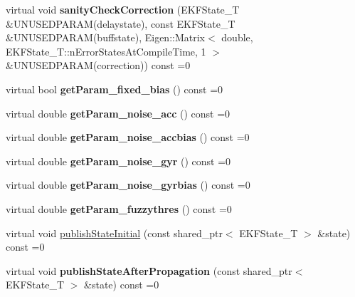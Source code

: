 \begin{DoxyCompactItemize}
\item 
\hypertarget{classmsf__core_1_1MSF__SensorManager_ae605f79877bbdd7ec297d5fe375f4c92}{virtual void {\bfseries sanity\-Check\-Correction} (E\-K\-F\-State\-\_\-\-T \&U\-N\-U\-S\-E\-D\-P\-A\-R\-A\-M(delaystate), const E\-K\-F\-State\-\_\-\-T \&U\-N\-U\-S\-E\-D\-P\-A\-R\-A\-M(buffstate), Eigen\-::\-Matrix$<$ double, E\-K\-F\-State\-\_\-\-T\-::n\-Error\-States\-At\-Compile\-Time, 1 $>$ \&U\-N\-U\-S\-E\-D\-P\-A\-R\-A\-M(correction)) const =0}\label{classmsf__core_1_1MSF__SensorManager_ae605f79877bbdd7ec297d5fe375f4c92}

\item 
\hypertarget{classmsf__core_1_1MSF__SensorManager_a5eb7188dea0d2aa231732199fd06b988}{virtual bool {\bfseries get\-Param\-\_\-fixed\-\_\-bias} () const =0}\label{classmsf__core_1_1MSF__SensorManager_a5eb7188dea0d2aa231732199fd06b988}

\item 
\hypertarget{classmsf__core_1_1MSF__SensorManager_a647bebf2feecd2929f58d6b4c8b3b319}{virtual double {\bfseries get\-Param\-\_\-noise\-\_\-acc} () const =0}\label{classmsf__core_1_1MSF__SensorManager_a647bebf2feecd2929f58d6b4c8b3b319}

\item 
\hypertarget{classmsf__core_1_1MSF__SensorManager_a7e7342acff24a4b5c5817903b2c8dfda}{virtual double {\bfseries get\-Param\-\_\-noise\-\_\-accbias} () const =0}\label{classmsf__core_1_1MSF__SensorManager_a7e7342acff24a4b5c5817903b2c8dfda}

\item 
\hypertarget{classmsf__core_1_1MSF__SensorManager_ae7b3b5a203fe118961ecdf28b49bfaa9}{virtual double {\bfseries get\-Param\-\_\-noise\-\_\-gyr} () const =0}\label{classmsf__core_1_1MSF__SensorManager_ae7b3b5a203fe118961ecdf28b49bfaa9}

\item 
\hypertarget{classmsf__core_1_1MSF__SensorManager_a8a5c694d3c6e5bd5bf4724269613bcb6}{virtual double {\bfseries get\-Param\-\_\-noise\-\_\-gyrbias} () const =0}\label{classmsf__core_1_1MSF__SensorManager_a8a5c694d3c6e5bd5bf4724269613bcb6}

\item 
\hypertarget{classmsf__core_1_1MSF__SensorManager_ab4498922d3d876ed9c4c5eeb7e090529}{virtual double {\bfseries get\-Param\-\_\-fuzzythres} () const =0}\label{classmsf__core_1_1MSF__SensorManager_ab4498922d3d876ed9c4c5eeb7e090529}

\item 
virtual void \hyperlink{classmsf__core_1_1MSF__SensorManager_ad851fff1bceaeb6696ef79a4792a317a}{publish\-State\-Initial} (const shared\-\_\-ptr$<$ E\-K\-F\-State\-\_\-\-T $>$ \&state) const =0
\item 
\hypertarget{classmsf__core_1_1MSF__SensorManager_a431f5b517c39fd9b2168857ae9513f8b}{virtual void {\bfseries publish\-State\-After\-Propagation} (const shared\-\_\-ptr$<$ E\-K\-F\-State\-\_\-\-T $>$ \&state) const =0}\label{classmsf__core_1_1MSF__SensorManager_a431f5b517c39fd9b2168857ae9513f8b}


\end{DoxyCompactItemize}
